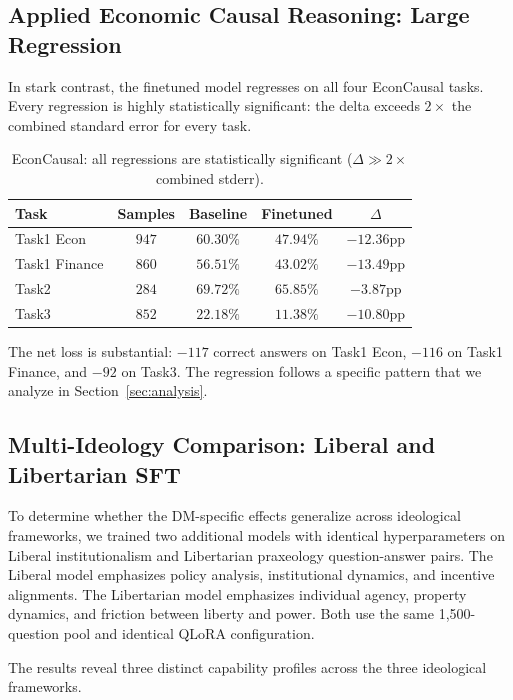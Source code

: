 \documentclass[sigconf]{acmart}
\begin{document}
\subsection{Applied Economic Causal Reasoning: Large Regression}

In stark contrast, the finetuned model regresses on all four EconCausal tasks. Every regression is highly statistically significant: the delta exceeds $2\times$ the combined standard error for every task.

\begin{table}
\caption{EconCausal: all regressions are statistically significant ($\Delta \gg 2\times$ combined stderr).}
\label{tab:econcausal}
\begin{tabular}{lcccc}
\toprule
Task & Samples & Baseline & Finetuned & $\Delta$ \\
\midrule
Task1 Econ & $947$ & $60.30\%$ & $47.94\%$ & $\mathbf{-12.36}$pp \\
Task1 Finance & $860$ & $56.51\%$ & $43.02\%$ & $\mathbf{-13.49}$pp \\
Task2 & $284$ & $69.72\%$ & $65.85\%$ & $\mathbf{-3.87}$pp \\
Task3 & $852$ & $22.18\%$ & $11.38\%$ & $\mathbf{-10.80}$pp \\
\bottomrule
\end{tabular}
\end{table}

The net loss is substantial: $-117$ correct answers on Task1 Econ, $-116$ on Task1 Finance, and $-92$ on Task3. The regression follows a specific pattern that we analyze in Section~\ref{sec:analysis}.

\subsection{Multi-Ideology Comparison: Liberal and Libertarian SFT}

To determine whether the DM-specific effects generalize across ideological frameworks, we trained two additional models with identical hyperparameters on Liberal institutionalism and Libertarian praxeology question-answer pairs. The Liberal model emphasizes policy analysis, institutional dynamics, and incentive alignments. The Libertarian model emphasizes individual agency, property dynamics, and friction between liberty and power. Both use the same 1,500-question pool and identical QLoRA configuration.

The results reveal three distinct capability profiles across the three ideological frameworks.
\end{document}
